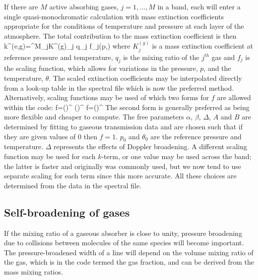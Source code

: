 If there are $M$ active absorbing gases, $j=1,\dots, M$   in a band, each 
will enter a single quasi-monochromatic calculation with mass extinction
coefficients appropriate for the conditions of temperature and pressure
at each layer of the atmosphere.
The total contribution to the mass extinction coefficient is then
\beq
k^{(e,g)}=\sum^{M}_{j}K^{(g)}_{j} q_{j} f_{j}(p,\theta)
\label{p2_eq28}
\eeq
where $K^{(g)}_{j}$ is a mass extinction coefficient at reference pressure
and temperature, $q_{j}$ is the mixing ratio of the $j^{th}$ gas and $f_{j}$ is 
the  scaling function, which allows for variations in the
pressure, $p$, and the temperature, $\theta$. The scaled extinction
coefficients may be interpolated directly from a look-up table in the
spectral file which is now the preferred method. Alternatively, scaling
functions may be used of which two forms for $f$ are allowed within the code:
\beq
f=\bigg(\bigg)^{\alpha} 
\bigg(\bigg)^{\beta}
\label{p2_eq29}
\eeq
\beq
f=\bigg(\bigg)^{\alpha} 
\label{p2_eq30}
\eeq
The second form is generally preferred as being more flexible and 
cheaper  to compute. The free parameters $\alpha$,
$\beta$, $\Delta$, $A$ and $B$ are determined by fitting to gaseous 
transmission data and are chosen such  that if 
they are given values of 0 then $f=1$. $p_{0}$  and $\theta_{0}$  are the 
reference pressure and temperature. $\Delta$  
represents the effects of Doppler broadening. A different scaling 
function may be used for each $k$-term, or one 
value may be used across the band; the latter is faster and originally
was commonly used, but we now tend to use separate scaling for each
term since this more accurate. 
All these choices are determined 
from the data in the spectral file.

\subsection{Self-broadening of gases}

If the mixing ratio of a gaseous absorber is close to unity,
pressure broadening due to collisions between molecules of the same
species will become important. The pressure-broadened width of a line
will depend on the volume mixing ratio of the gas, which is in the code
termed the gas fraction, and can be derived from the mass mixing ratios.

